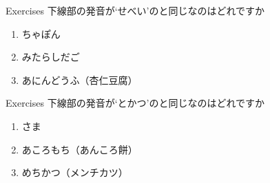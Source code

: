 \documentclass[aspectratio=169,xcolor={dvipsnames,table}]{beamer}
\begin{document}
\begin{frame}[plain]{Exercises}
下線部の発音が`せべい'のと同じなのはどれですか

\begin{enumerate}
 \item ちゃぽん
 \item みたらしだご
 \item あにんどうふ（杏仁豆腐）

\end{enumerate}
\end{frame}
\begin{frame}[plain]{Exercises}
下線部の発音が`とかつ'のと同じなのはどれですか

\begin{enumerate}
 \item さま
 \item あころもち（あんころ餅）
 \item めちかつ（メンチカツ）

\end{enumerate}
\end{frame}
\end{document}
